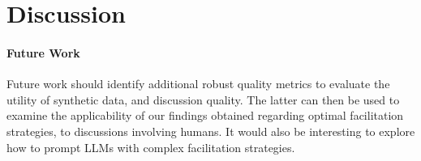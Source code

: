 %
\section{Discussion}
\paragraph{Future Work}Future work should identify additional robust quality metrics to evaluate the utility of synthetic data, and discussion quality. The latter can then be used to examine the applicability of our findings obtained regarding optimal facilitation strategies, to discussions involving humans. It would also be interesting to explore how to prompt LLMs with complex facilitation strategies.